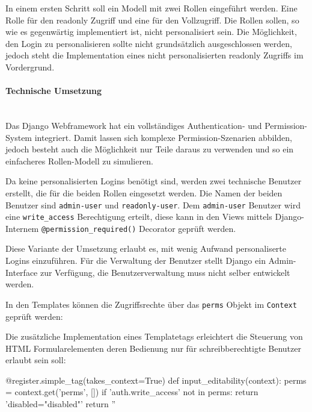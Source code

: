 In einem ersten Schritt soll ein Modell mit zwei Rollen eingeführt werden. Eine
Rolle für den readonly Zugriff und eine für den Vollzugriff. Die Rollen sollen,
so wie es gegenwärtig implementiert ist, nicht personalisiert sein. Die
Möglichkeit, den Login zu personalisieren sollte nicht grundsätzlich
ausgeschlossen werden, jedoch steht die Implementation eines nicht
personalisierten readonly Zugriffs im Vordergrund.

\paragraph{Technische Umsetzung} \hspace{0pt} \\
Das Django Webframework hat ein vollständiges Authentication- und
Permission-System integriert. Damit lassen sich komplexe Permission-Szenarien
abbilden, jedoch besteht auch die Möglichkeit nur Teile daraus zu verwenden und
so ein einfacheres Rollen-Modell zu simulieren.

Da keine personalisierten Logins benötigt sind, werden zwei technische Benutzer
erstellt, die für die beiden Rollen eingesetzt werden. Die Namen der beiden Benutzer sind 
 \texttt{admin-user} und \texttt{readonly-user}. Dem
\texttt{admin-user} Benutzer wird eine \texttt{write\_access} Berechtigung erteilt, diese
kann in den Views mittels Django-Internem \texttt{@permission\_required()}
Decorator geprüft werden.

Diese Variante der Umsetzung erlaubt es, mit wenig Aufwand personaliserte Logins
einzuführen. Für die Verwaltung der Benutzer stellt Django ein Admin-Interface
zur Verfügung, die Benutzerverwaltung muss nicht selber entwickelt werden.

In den Templates können die Zugriffsrechte über das \texttt{perms} Objekt im
\texttt{Context} geprüft werden:


Die zusätzliche Implementation eines Templatetags erleichtert die Steuerung von HTML Formularelementen deren Bedienung nur für schreibberechtigte Benutzer erlaubt sein soll:

\begin{pythoncode}
@register.simple_tag(takes_context=True)
def input_editability(context):
    perms = context.get('perms', [])
    if 'auth.write_access' not in perms:
        return 'disabled="disabled"'
    return ''
\end{pythoncode}

